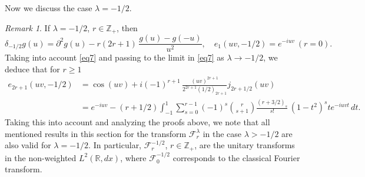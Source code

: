 \documentclass[12pt,twoside,reqno]{amsart}\usepackage[cp1251]{inputenc}
\theoremstyle{plain}
\theoremstyle{remark}
\newtheorem{remark}[theorem]{Remark}
\begin{document}
Now we discuss the case $\lambda=-1/2$.
\begin{remark}%
If $\lambda=-1/2$, $r\in\mathbb{Z}_+$, then
\[
\delta_{-1/2}g(u)=\partial^{2}g(u)-r(2r+1)\,\frac{g(u)-g(-u)}{u^2},\quad e_{1}(uv,-1/2)=e^{-iuv} \ (r=0).
\]
Taking into account \eqref{eq7} and  passing to the limit in \eqref{eq7} as $\lambda\to -1/2$, we deduce that for $r\ge 1$
\begin{align*}
e_{2r+1}(uv,-1/2)&=\cos{}(uv)+
i(-1)^{r+1}\,\frac{(uv)^{2r+1}}{2^{2r+1}(1/2)_{2r+1}}
j_{2r+1/2}(uv)\\
&=e^{-iuv}-(r+1/2)\int_{-1}^{1}\sum_{s=0}^{r-1}(-1)^s\binom{r}{s+1}\frac{(r+3/2)_s}{s!}\,(1-t^2)^ste^{-iuvt}\,dt.
\end{align*}
Taking this into account  and analyzing the proofs above,
we note that
all mentioned results in this section for the transform $\mathcal{F}_{r}^{\lambda}$ in the case $\lambda>-1/2$ are also valid for $\lambda=-1/2$. In particular,
  $\mathcal{F}_{r}^{-1/2}$, $r\in\mathbb{Z}_+$, are the unitary transforms in the non-weighted  $L^2(\mathbb{R},dx)$, where
 $\mathcal{F}_{0}^{-1/2}$ corresponds to the classical Fourier transform.
\end{remark}
\end{document}
